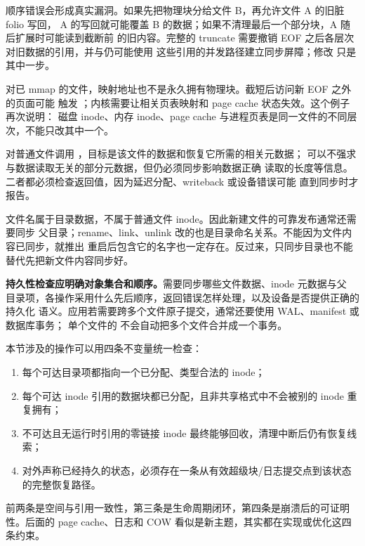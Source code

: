 顺序错误会形成真实漏洞。如果先把物理块分给文件 B，再允许文件 A 的旧脏 folio 写回，
A 的写回就可能覆盖 B 的数据；如果不清理最后一个部分块，A 随后扩展时可能读到截断前
的旧内容。完整的 truncate 需要撤销 EOF 之后各层次对旧数据的引用，并与仍可能使用
这些引用的并发路径建立同步屏障；修改  只是其中一步。

对已 mmap 的文件，映射地址也不是永久拥有物理块。截短后访问新 EOF 之外的页面可能
触发 ；内核需要让相关页表映射和 page cache 状态失效。这个例子再次说明：
磁盘 inode、内存 inode、page cache 与进程页表是同一文件的不同层次，不能只改其中一个。


对普通文件调用 ，目标是该文件的数据和恢复它所需的相关元数据；
 可以不强求与数据读取无关的部分元数据，但仍必须同步影响数据正确
读取的长度等信息。二者都必须检查返回值，因为延迟分配、writeback 或设备错误可能
直到同步时才报告。

文件名属于目录数据，不属于普通文件 inode。因此新建文件的可靠发布通常还需要同步
父目录；rename、link、unlink 改的也是目录命名关系。不能因为文件内容已同步，就推出
重启后包含它的名字也一定存在。反过来，只同步目录也不能替代先把新文件内容同步好。

\textbf{持久性检查应明确对象集合和顺序。}需要同步哪些文件数据、inode 元数据与父
目录项，各操作采用什么先后顺序，返回错误怎样处理，以及设备是否提供正确的持久化
语义。应用若需要跨多个文件原子提交，通常还要使用 WAL、manifest 或数据库事务；
单个文件的  不会自动把多个文件合并成一个事务。

本节涉及的操作可以用四条不变量统一检查：

\begin{enumerate}\tightlist
\item 每个可达目录项都指向一个已分配、类型合法的 inode；
\item 每个可达 inode 引用的数据块都已分配，且非共享格式中不会被别的 inode 重复拥有；
\item 不可达且无运行时引用的零链接 inode 最终能够回收，清理中断后仍有恢复线索；
\item 对外声称已经持久的状态，必须存在一条从有效超级块/日志提交点到该状态的完整恢复路径。
\end{enumerate}

前两条是空间与引用一致性，第三条是生命周期闭环，第四条是崩溃后的可证明性。后面的
page cache、日志和 COW 看似是新主题，其实都在实现或优化这四条约束。
